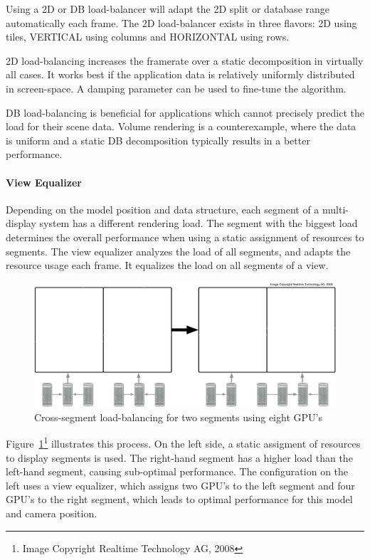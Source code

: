 \documentclass[10pt,a4]{scrartcl}
\newcommand{\fig}[1]{Figure~\ref{#1}}
\begin{document}
Using a 2D or DB load-balancer will adapt the 2D split or database range
automatically each frame. The 2D load-balancer exists in three flavors:
\textsf{2D} using tiles, \textsf{VERTICAL} using columns and
\textsf{HORIZONTAL} using rows.

2D load-balancing increases the framerate over a static decomposition in
virtually all cases. It works best if the application data is relatively
uniformly distributed in screen-space. A damping parameter can be used
to fine-tune the algorithm.

DB load-balancing is beneficial for applications which cannot precisely
predict the load for their scene data. Volume rendering is a
counterexample, where the data is uniform and a static DB decomposition
typically results in a better performance.

\paragraph{View Equalizer}
Depending on the model position and data structure, each segment of a
multi-display system has a different rendering load. The segment with
the biggest load determines the overall performance when using a static
assignment of resources to segments. The view equalizer analyzes the
load of all segments, and adapts the resource usage each frame. It
equalizes the load on all segments of a view.

\begin{figure}
  \includegraphics[width=.618\textwidth]{images/viewLB.pdf}
  {\caption{\label{fViewLoadBalancing}\small Cross-segment
      load-balancing for two segments using eight GPU's}}
\end{figure}
\fig{fViewLoadBalancing}\footnote{Image Copyright Realtime Technology
  AG, 2008} illustrates this process. On the left side, a static
assigment of resources to display segments is used. The right-hand
segment has a higher load than the left-hand segment, causing
sub-optimal performance. The configuration on the left uses a view
equalizer, which assigns two GPU's to the left segment and four GPU's to
the right segment, which leads to optimal performance for this model and
camera position.
\end{document}
